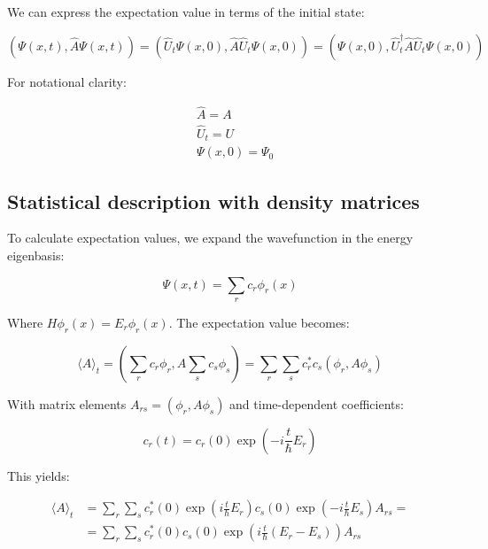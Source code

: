 \documentclass[italian]{HKNdocument}
\begin{document}
We can express the expectation value in terms of the initial state:

\begin{equation}
(\Psi(x, t), \hat{A} \Psi(x, t))=\left(\hat{U}_{t} \Psi(x, 0), \hat{A} \hat{U}_{t} \Psi(x, 0)\right)=\left(\Psi(x, 0), \hat{U}_{t}^{\dagger} \hat{A} \hat{U}_{t} \Psi(x, 0)\right) \label{eq:10.30}
\end{equation}

For notational clarity:

\begin{align}
& \hat{A}=A \\
& \hat{U}_{t}=U  \label{eq:10.31}\\
& \Psi(x, 0)=\Psi_{0}
\end{align}

\subsection{Statistical description with density matrices}
To calculate expectation values, we expand the wavefunction in the energy eigenbasis:

\begin{equation}
\Psi(x, t)=\sum_{r} c_{r} \phi_{r}(x) \label{eq:10.32}
\end{equation}

Where $H \phi_{r}(x)=E_{r} \phi_{r}(x)$. The expectation value becomes:

\begin{equation}
\langle A\rangle_{t}=\left(\sum_{r} c_{r} \phi_{r}, A \sum_{s} c_{s} \phi_{s}\right)=\sum_{r} \sum_{s} c_{r}^{*} c_{s}\left(\phi_{r}, A \phi_{s}\right) \label{eq:10.33}
\end{equation}

With matrix elements $A_{rs} = (\phi_r, A\phi_s)$ and time-dependent coefficients:

\begin{equation}
c_{r}(t)=c_{r}(0) \exp \left(-i \frac{t}{\hbar} E_{r}\right) \label{eq:10.34}
\end{equation}

This yields:

\begin{align}
\langle A\rangle_{t} & =\sum_{r} \sum_{s} c_{r}^{*}(0) \exp \left(i \frac{t}{\hbar} E_{r}\right) c_{s}(0) \exp \left(-i \frac{t}{\hbar} E_{s}\right) A_{r s}= \\
& =\sum_{r} \sum_{s} c_{r}^{*}(0) c_{s}(0) \exp \left(i \frac{t}{\hbar}\left(E_{r}-E_{s}\right)\right) A_{r s} \label{eq:10.35}
\end{align}
\end{document}
